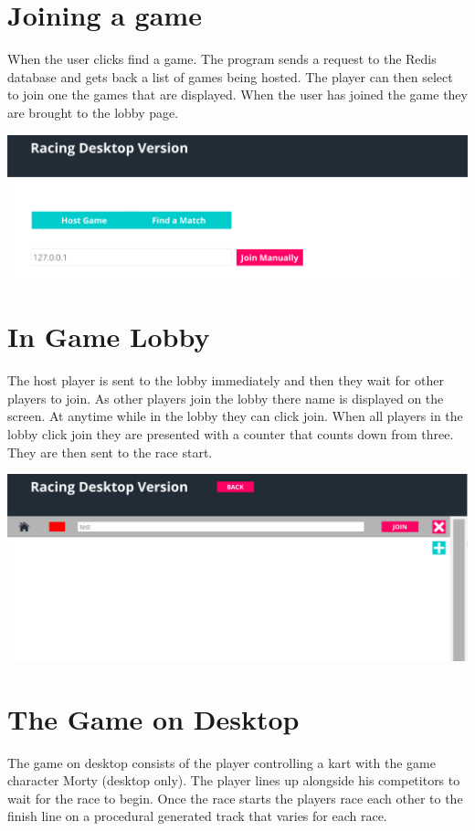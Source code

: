 \section{Joining a game}
When the user clicks find a game. The program sends a request to the Redis database and gets back a list of games being hosted. The player can then select to join one the games that are displayed. When the user has joined the game they are brought to the lobby page.
\newline

\includegraphics[width=1\columnwidth]{img/MatchFinder1Actual.PNG}

\section{In Game Lobby}
The host player is sent to the lobby immediately and then they wait for other players to join. As other players join the lobby there name is displayed on the screen. At anytime while in the lobby they can click join. When all players in the lobby click join they are presented with a counter that counts down from three. They are then sent to the race start. \newline

\includegraphics[width=1\columnwidth]{img/LobbyActual.PNG}

\section{The Game on Desktop}
The game on desktop consists of the player controlling a kart with the game character Morty (desktop only). The player lines up alongside his competitors to wait for the race to begin. Once the race starts the players race each other to the finish line on a procedural generated track that varies for each race.\newline

